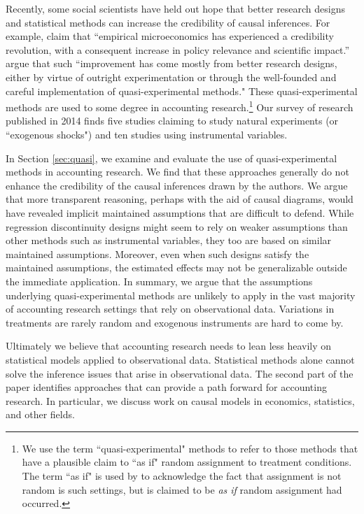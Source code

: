 \documentclass[11pt,reqno,titlepage]{amsart}
\begin{document}
\begin{doublespace}
Recently, some social scientists have held out hope that better research designs and statistical methods can increase the credibility of causal inferences.
For example, \citet{Angrist:2010jv} claim that ``empirical microeconomics has experienced a credibility revolution, with a consequent increase in policy relevance and scientific impact.''  
\citet[p. 26]{Angrist:2010jv} argue that such ``improvement has come mostly from better research designs, either by virtue of outright experimentation or through the well-founded and careful implementation of quasi-experimental methods."
These quasi-experimental methods are used to some degree in accounting research.\footnote{
We use the term ``quasi-experimental" methods to refer to those methods that have a plausible claim to ``as if" random assignment to treatment conditions.
The term ``as if" is used by \citet{Dunning:2012tt} to acknowledge the fact that assignment is not random is such settings, but is claimed to be \emph{as if} random assignment had occurred.}
Our survey of research published in 2014 finds five studies claiming to study natural experiments (or ``exogenous shocks") and ten studies using instrumental variables.

In Section \ref{sec:quasi}, we examine and evaluate the use of quasi-experimental methods in accounting research.
We find that these approaches generally do not enhance the credibility of the causal inferences drawn by the authors.
We argue that more transparent reasoning, perhaps with the aid of causal diagrams, would have revealed implicit maintained assumptions that are difficult to defend.
While regression discontinuity designs might seem to rely on weaker assumptions than other methods such as instrumental variables, they too are based on similar maintained assumptions. Moreover, even when such designs satisfy the maintained assumptions, the estimated effects may not be generalizable outside the immediate application.
In summary, we argue that the assumptions underlying quasi-experimental methods are unlikely to apply in the vast majority of accounting research settings that rely on observational data.
Variations in treatments are rarely random and exogenous instruments are hard to come by.

Ultimately we believe that accounting research needs to lean less heavily on statistical models applied to observational data.
Statistical methods alone cannot solve the inference issues that arise in observational data. 
The second part of the paper identifies approaches that can provide a path forward for accounting research.
In particular, we discuss work on causal models in economics, statistics, and other fields.


\end{doublespace}
\end{document}
